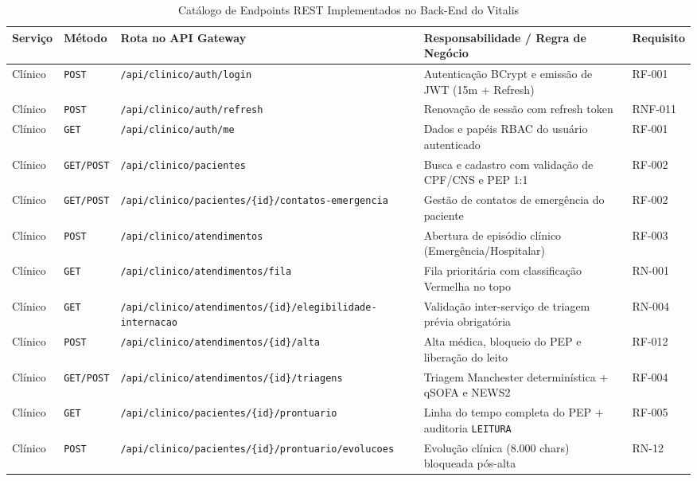 \begin{table}[H]
\centering
\scriptsize
\caption{Catálogo de Endpoints REST Implementados no Back-End do Vitalis}
\label{tab:endpoints_backend}
\begin{tabularx}{\textwidth}{l l >{\raggedright\arraybackslash}p{4.8cm} >{\raggedright\arraybackslash}X l}
\toprule
\textbf{Serviço} & \textbf{Método} & \textbf{Rota no API Gateway} & \textbf{Responsabilidade / Regra de Negócio} & \textbf{Requisito} \\
\midrule
Clínico & \texttt{POST} & \texttt{/api/clinico/auth/login} & Autenticação BCrypt e emissão de JWT (15m + Refresh) & RF-001 \\
Clínico & \texttt{POST} & \texttt{/api/clinico/auth/refresh} & Renovação de sessão com refresh token & RNF-011 \\
Clínico & \texttt{GET} & \texttt{/api/clinico/auth/me} & Dados e papéis RBAC do usuário autenticado & RF-001 \\
Clínico & \texttt{GET/POST} & \texttt{/api/clinico/pacientes} & Busca e cadastro com validação de CPF/CNS e PEP 1:1 & RF-002 \\
Clínico & \texttt{GET/POST} & \texttt{/api/clinico/pacientes/\{id\}/contatos-emergencia} & Gestão de contatos de emergência do paciente & RF-002 \\
Clínico & \texttt{POST} & \texttt{/api/clinico/atendimentos} & Abertura de episódio clínico (Emergência/Hospitalar) & RF-003 \\
Clínico & \texttt{GET} & \texttt{/api/clinico/atendimentos/fila} & Fila prioritária com classificação Vermelha no topo & RN-001 \\
Clínico & \texttt{GET} & \texttt{/api/clinico/atendimentos/\{id\}/elegibilidade-internacao} & Validação inter-serviço de triagem prévia obrigatória & RN-004 \\
Clínico & \texttt{POST} & \texttt{/api/clinico/atendimentos/\{id\}/alta} & Alta médica, bloqueio do PEP e liberação do leito & RF-012 \\
Clínico & \texttt{GET/POST} & \texttt{/api/clinico/atendimentos/\{id\}/triagens} & Triagem Manchester determinística + qSOFA e NEWS2 & RF-004 \\
Clínico & \texttt{GET} & \texttt{/api/clinico/pacientes/\{id\}/prontuario} & Linha do tempo completa do PEP + auditoria \texttt{LEITURA} & RF-005 \\
Clínico & \texttt{POST} & \texttt{/api/clinico/pacientes/\{id\}/prontuario/evolucoes} & Evolução clínica (8.000 chars) bloqueada pós-alta & RN-12 \\

\end{tabularx}
\end{table}
